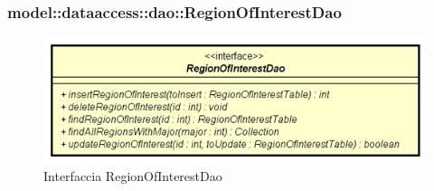 \documentclass[../DefinizioneDiProdotto.tex]{subfiles}
\begin{document}
\subsubsection{model::dataaccess::dao::RegionOfInterestDao}

    \begin{figure}[H]
        \centering
        \includegraphics{img/RegionOfInterestDao.png}
        \caption{Interfaccia RegionOfInterestDao}\label{fig:model::dataaccess::dao::RegionOfInterestDao} 
    \end{figure}
\end{document}
